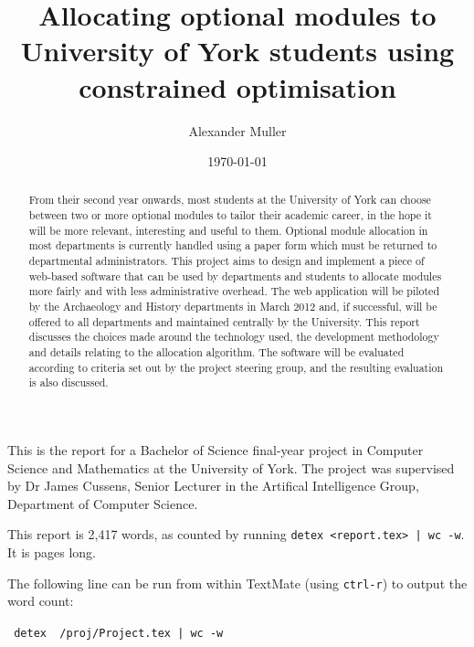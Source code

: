 \documentclass[]{scrartcl}
\title{Allocating optional modules to University of York students using constrained optimisation}
\author{Alexander Muller}
\date{\today}
\begin{document}
\ifpdf
{}
\else
{}
\fi

\maketitle

This is the report for a Bachelor of Science final-year project in Computer
Science and Mathematics at the University of York. The project was supervised
by Dr James Cussens, Senior Lecturer in the Artifical Intelligence Group,
Department of Computer Science.

This report is 2,417 words, as counted by running \texttt{detex <report.tex> |
wc -w}. It is \pageref{LastPage} pages long.


The following line can be run from within TextMate (using \texttt{ctrl-r}) to
output the word count:

\texttt{
detex ~/proj/Project.tex | wc -w
}

\newpage

\begin{abstract}
  From their second year onwards, most students at the University of York can  choose between two or more optional modules to tailor their academic career, in the hope it will be more relevant, interesting and useful to them.
  Optional module allocation in most departments is currently handled using a paper form which must be returned to departmental administrators. This project aims to design and implement a piece of web-based software that can be used by departments and students to allocate modules more fairly and with less administrative overhead.
  The web application will be piloted by the Archaeology and History departments in March 2012 and, if successful, will be offered to all departments and maintained centrally by the University.
  This report discusses the choices made around the technology used, the development methodology and details relating to the allocation algorithm.
  The software will be evaluated according to criteria set out by the project steering group, and the resulting evaluation is also discussed.
\end{abstract}
\end{document}
